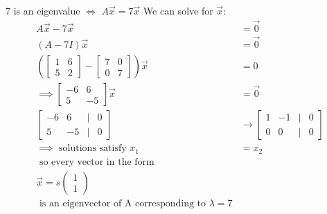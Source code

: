 $7$ is an eigenvalue $\Leftrightarrow$ $A\vec{x}=7\vec{x}$
We can solve for $\vec{x}$:
$$
\begin{align}
A\vec{x}-7\vec{x}&=\vec{0} \\
(A-7I)\vec{x}&=\vec{0}  \\
\left( \begin{bmatrix}
1 & 6\\5 & 2
\end{bmatrix} - \begin{bmatrix}
7 & 0\\0 & 7
\end{bmatrix} \right) \vec{x} &= 0 \\
\implies \begin{bmatrix}
-6 & 6\\5 & -5
\end{bmatrix}\vec{x}&=\vec{0} \\
\begin{bmatrix}
-6 & 6 & | & 0 \\
5 & -5 & | & 0
\end{bmatrix} &\to   \begin{bmatrix}
1 & -1 & | & 0 \\
0 & 0 & | & 0
\end{bmatrix} \\
\implies \text{ solutions satisfy }x_{1}&=x_{2} \\
 \text{ so every vector in the form } &\\
\vec{x}=s\begin{pmatrix}
1\\1
\end{pmatrix}\\\text{ is an eigenvector of A corresponding to }\lambda= 7
\end{align}
$$


